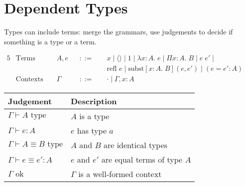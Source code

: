 \documentclass[11pt]{article}
\begin{document}
\section{Dependent Types}
{

    Types can include terms: merge the grammars, use judgements to decide if something is a type or a term.

    \begin{alignat*}{5}
    &\text{Terms } &&A,e &&::=\; &&x \mid \langle\rangle \mid 1 \mid \lambda x:A.\;e \mid \Pi x:A.\;B \mid e\;e' \mid \\
    &&&&&&&\text{refl }e \mid \text{subst}[x:A.\;B](e,e') \mid (e=e':A) && \\
    &\text{Contexts } &&\Gamma &&::=\; &&\cdot \mid \Gamma,x:A &&
    \end{alignat*}

    \begin{tabular}{l | l}
    Judgement & Description \\
    \hline
    \(\Gamma\vdash A\text{ type}\) & \(A\) is a type \\
    \(\Gamma\vdash e : A\) & \(e\) has type \(a\) \\
    \(\Gamma\vdash A \equiv B\text{ type}\) & \(A\) and \(B\) are identical types \\
    \(\Gamma\vdash e \equiv e' : A\) & \(e\) and \(e'\) are equal terms of type \(A\) \\
    \(\Gamma\text{ ok}\) & \(\Gamma\) is a well-formed context
    \end{tabular}

    \vspace{5mm}

}
\end{document}

